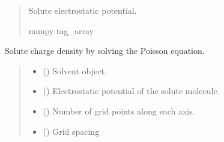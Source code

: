 \documentclass[letterpaper,10pt,english]{sphinxmanual}
\begin{document}
\begin{fulllineitems}
\begin{fulllineitems}
\begin{quote}
\begin{description}
\sphinxAtStartPar
Solute electrostatic potential.

\sphinxAtStartPar
numpy tag\_array

\end{description}\end{quote}

\end{fulllineitems}


\begin{fulllineitems}
\label{\detokenize{fcdft.solvent:fcdft.solvent.pbe.PBE.make_rho_sol}}
\pysigstartsignatures
\pysiglinewithargsret
{}
{\sphinxparamcomma {}\sphinxparamcomma {}}
{}
\pysigstopsignatures
\sphinxAtStartPar
Solute charge density by solving the Poisson equation.
\begin{quote}\begin{description}
\begin{itemize}
\item {} 
\sphinxAtStartPar
{} ({\hyperref[\detokenize{fcdft.solvent:fcdft.solvent.pbe.PBE}]{}}) \textendash{} Solvent object.

\item {} 
\sphinxAtStartPar
{} () \textendash{} Electrostatic potential of the solute molecule.

\item {} 
\sphinxAtStartPar
{} () \textendash{} Number of grid points along each axis.

\item {} 
\sphinxAtStartPar
{} () \textendash{} Grid spacing

\end{itemize}


\end{description}
\end{quote}
\end{fulllineitems}
\end{fulllineitems}
\end{document}
